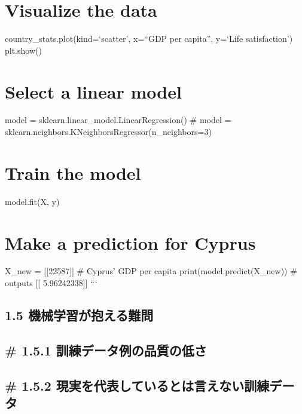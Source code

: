 \hypertarget{visualize-the-data}{%
\section{Visualize the data}\label{visualize-the-data}}

country\_stats.plot(kind=`scatter', x=``GDP per capita'', y=`Life
satisfaction') plt.show()

\hypertarget{select-a-linear-model}{%
\section{Select a linear model}\label{select-a-linear-model}}

model = sklearn.linear\_model.LinearRegression() \# model =
sklearn.neighbors.KNeighborsRegressor(n\_neighbors=3)

\hypertarget{train-the-model}{%
\section{Train the model}\label{train-the-model}}

model.fit(X, y)

\hypertarget{make-a-prediction-for-cyprus}{%
\section{Make a prediction for
Cyprus}\label{make-a-prediction-for-cyprus}}

X\_new = {[}{[}22587{]}{]} \# Cyprus' GDP per capita
print(model.predict(X\_new)) \# outputs {[}{[} 5.96242338{]}{]} ```

\hypertarget{ux6a5fux68b0ux5b66ux7fd2ux304cux62b1ux3048ux308bux96e3ux554f}{%
\subsection{1.5
機械学習が抱える難問}\label{ux6a5fux68b0ux5b66ux7fd2ux304cux62b1ux3048ux308bux96e3ux554f}}

\hypertarget{ux8a13ux7df4ux30c7ux30fcux30bfux4f8bux306eux54c1ux8ceaux306eux4f4eux3055}{%
\subsection{\# 1.5.1
訓練データ例の品質の低さ}\label{ux8a13ux7df4ux30c7ux30fcux30bfux4f8bux306eux54c1ux8ceaux306eux4f4eux3055}}

\hypertarget{ux73feux5b9fux3092ux4ee3ux8868ux3057ux3066ux3044ux308bux3068ux306fux8a00ux3048ux306aux3044ux8a13ux7df4ux30c7ux30fcux30bf}{%
\subsection{\# 1.5.2
現実を代表しているとは言えない訓練データ}\label{ux73feux5b9fux3092ux4ee3ux8868ux3057ux3066ux3044ux308bux3068ux306fux8a00ux3048ux306aux3044ux8a13ux7df4ux30c7ux30fcux30bf}}

